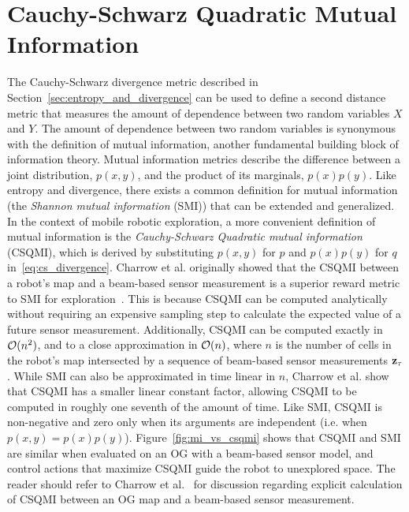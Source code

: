 \section{Cauchy-Schwarz Quadratic Mutual Information}
\label{sec:csqmi}

The Cauchy-Schwarz divergence metric described in Section~\ref{sec:entropy_and_divergence} can be
used to define a second distance metric that measures the amount of dependence
between two random variables $X$ and $Y$. The amount of dependence between two
random variables is synonymous with the definition of mutual information, another
fundamental building block of information theory. Mutual information metrics
describe the difference between a joint distribution, $p(x, y)$, and the product
of its marginals, $p(x)p(y)$. Like entropy and divergence, there exists a common
definition for mutual information (the \textit{Shannon mutual information} (SMI)) that can be
extended and generalized. In the context of mobile robotic exploration, a more convenient
definition of mutual information is the \textit{Cauchy-Schwarz Quadratic mutual
information} (CSQMI), which is derived
by substituting $p(x, y)$ for $p$ and $p(x)p(y)$ for $q$
in~\eqref{eq:cs_divergence}.
%
%
Charrow et al. originally showed that the CSQMI between a robot's map and a beam-based
sensor measurement is a superior reward metric to SMI for
exploration~\cite{charrow2015icra}. This is because CSQMI can be computed
analytically without requiring an expensive sampling step to
calculate the expected value of a future sensor measurement. Additionally,
CSQMI can be computed exactly in $\mathcal{O}(n^2)$, and to a close approximation
in $\mathcal{O}(n)$, where $n$ is the number of cells in the robot's map intersected by a
sequence of beam-based sensor measurements $\mathbf{z}_{\mathbf{\tau}}$. While SMI can also be approximated in time linear in
$n$, Charrow et al. show that CSQMI has a smaller linear constant factor,
allowing CSQMI to be computed in roughly one seventh of the amount of time.
Like SMI, CSQMI is non-negative and zero only when its arguments are independent
(i.e. when $p(x, y) = p(x)p(y)$). Figure~\ref{fig:mi_vs_csqmi} shows that CSQMI and SMI are
similar when evaluated on an OG with a beam-based sensor model, and control actions
that maximize CSQMI guide the robot to unexplored space. The reader should refer
to Charrow et al.~\cite{charrow2015icra} for discussion regarding
explicit calculation of CSQMI between an OG map and a beam-based sensor
measurement.

